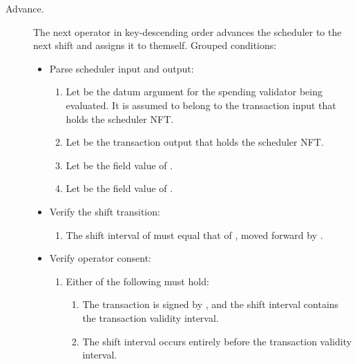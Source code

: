 \documentclass[../midgard.tex]{subfiles}
\begin{document}
\begin{description}
    \item[Advance.] The next operator in key-descending order advances the scheduler to the next shift and assigns it to themself. Grouped conditions:
        \begin{itemize}
            \item Parse scheduler input and output:
            \begin{enumerate}
                \item Let  be the datum argument for the spending validator being evaluated. It is assumed to belong to the transaction input that holds the scheduler NFT.
                \item Let  be the transaction output that holds the scheduler NFT.
                \item Let  be the  field value of .
                \item Let  be the  field value of .
            \end{enumerate}
            \item Verify the shift transition:
            \begin{enumerate}[resume]
                \item The shift interval of  must equal that of , moved forward by .
            \end{enumerate}
            
            \item Verify operator consent:
            \begin{enumerate}[resume]
                \item Either of the following must hold:
                \begin{enumerate}
                    \item The transaction is signed by , and the  shift interval contains the transaction validity interval.
                    \item The  shift interval occurs entirely before the transaction validity interval.
                \end{enumerate}
            \end{enumerate}
            

\end{itemize}
\end{description}
\end{document}
